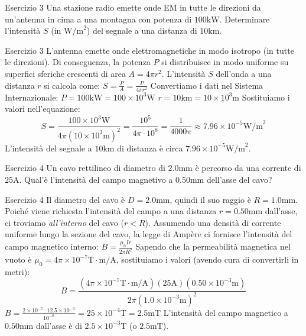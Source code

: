 \documentclass[a4paper]{article}
\begin{document}
\begin{snippetexercise}{Esercizio 3}
    Una stazione radio emette onde EM in tutte le direzioni da un'antenna in cima a una montagna con
    potenza di \(100 \mathrm{kW}\). Determinare l'intensità
    \(S\) (in \(\mathrm{W/m}^2\)) del segnale a una distanza di \(10 \mathrm{km}\).
\end{snippetexercise}
\begin{snippetsolution}{Esercizio 3}
    L'antenna emette onde elettromagnetiche in modo isotropo (in tutte le direzioni). Di conseguenza, la potenza \(P\) si distribuisce in modo uniforme su superfici sferiche crescenti di area \(A = 4\pi r^2\).
    L'intensità \(S\) dell'onda a una distanza \(r\) si calcola come:
    \(S = \frac{P}{A} = \frac{P}{4\pi r^2}\)
    Convertiamo i dati nel Sistema Internazionale:
    \(P = 100 \mathrm{kW} = 100 \times 10^3 \mathrm{W}\)
    \(r = 10 \mathrm{km} = 10 \times 10^3 \mathrm{m}\)
    Sostituiamo i valori nell'equazione:
    \[ S = \frac{100 \times 10^3 \mathrm{W}}{4\pi (10 \times 10^3 \mathrm{m})^2} = \frac{10^5}{4\pi \cdot 10^8} = \frac{1}{4000\pi} \approx 7.96 \times 10^{-5} \mathrm{W/m}^2 \]
    L'intensità del segnale a \(10 \mathrm{km}\) di distanza è circa \(7.96 \times 10^{-5} \mathrm{W/m}^2\).
\end{snippetsolution}
\begin{snippetexercise}{Esercizio 4}
    Un cavo rettilineo di diametro di \(2.0 \mathrm{mm}\) è percorso da una corrente di
    \(25 \mathrm{A}\). Qual'è l'intensità del campo magnetivo a \(0.50 \mathrm{mm}\) dell'asse del cavo?
\end{snippetexercise}
\begin{snippetsolution}{Esercizio 4}
    Il diametro del cavo è \(D = 2.0 \mathrm{mm}\), quindi il suo raggio è \(R = 1.0 \mathrm{mm}\).
    Poiché viene richiesta l'intensità del campo a una distanza \(r = 0.50 \mathrm{mm}\) dall'asse, ci troviamo \textit{all'interno} del cavo (\(r < R\)).
    Assumendo una densità di corrente uniforme lungo la sezione del cavo, la legge di Ampère ci fornisce l'intensità del campo magnetico interno:
    \(B = \frac{\mu_0 I r}{2\pi R^2}\)
    Sapendo che la permeabilità magnetica nel vuoto è \(\mu_0 = 4\pi \times 10^{-7} \mathrm{T \cdot m/A}\), sostituiamo i valori (avendo cura di convertirli in metri):
    \[ B = \frac{(4\pi \times 10^{-7} \mathrm{T \cdot m/A}) (25 \mathrm{A}) (0.50 \times 10^{-3} \mathrm{m})}{2\pi (1.0 \times 10^{-3} \mathrm{m})^2} \]
    \(B = \frac{2 \times 10^{-7} \cdot 12.5 \times 10^{-3}}{10^{-6}} = 25 \times 10^{-4} \mathrm{T} = 2.5 \mathrm{mT}\)
    L'intensità del campo magnetico a \(0.50 \mathrm{mm}\) dall'asse è di \(2.5 \times 10^{-3} \mathrm{T}\) (o \(2.5 \mathrm{mT}\)).
\end{snippetsolution}
\end{document}
